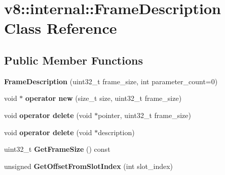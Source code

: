 \hypertarget{classv8_1_1internal_1_1_frame_description}{}\section{v8\+:\+:internal\+:\+:Frame\+Description Class Reference}
\label{classv8_1_1internal_1_1_frame_description}
\subsection*{Public Member Functions}
\begin{DoxyCompactItemize}
\item 
{\bfseries Frame\+Description} (uint32\+\_\+t frame\+\_\+size, int parameter\+\_\+count=0)\hypertarget{classv8_1_1internal_1_1_frame_description_a876a1a844ce8a1ed9843f0bfd00dd4f4}{}\label{classv8_1_1internal_1_1_frame_description_a876a1a844ce8a1ed9843f0bfd00dd4f4}

\item 
void $\ast$ {\bfseries operator new} (size\+\_\+t size, uint32\+\_\+t frame\+\_\+size)\hypertarget{classv8_1_1internal_1_1_frame_description_adb31357a74efb87f90ea81886d4baa74}{}\label{classv8_1_1internal_1_1_frame_description_adb31357a74efb87f90ea81886d4baa74}

\item 
void {\bfseries operator delete} (void $\ast$pointer, uint32\+\_\+t frame\+\_\+size)\hypertarget{classv8_1_1internal_1_1_frame_description_aee5885f86760273016b3e67405389c58}{}\label{classv8_1_1internal_1_1_frame_description_aee5885f86760273016b3e67405389c58}

\item 
void {\bfseries operator delete} (void $\ast$description)\hypertarget{classv8_1_1internal_1_1_frame_description_ab39a58e397a051f4b77eb31964790891}{}\label{classv8_1_1internal_1_1_frame_description_ab39a58e397a051f4b77eb31964790891}

\item 
uint32\+\_\+t {\bfseries Get\+Frame\+Size} () const \hypertarget{classv8_1_1internal_1_1_frame_description_a72013fd7ea12656feaee3bddd2b5f57a}{}\label{classv8_1_1internal_1_1_frame_description_a72013fd7ea12656feaee3bddd2b5f57a}

\item 
unsigned {\bfseries Get\+Offset\+From\+Slot\+Index} (int slot\+\_\+index)\hypertarget{classv8_1_1internal_1_1_frame_description_a11310120b9a6165d3e072840d8ab346c}{}\label{classv8_1_1internal_1_1_frame_description_a11310120b9a6165d3e072840d8ab346c}


\end{DoxyCompactItemize}
